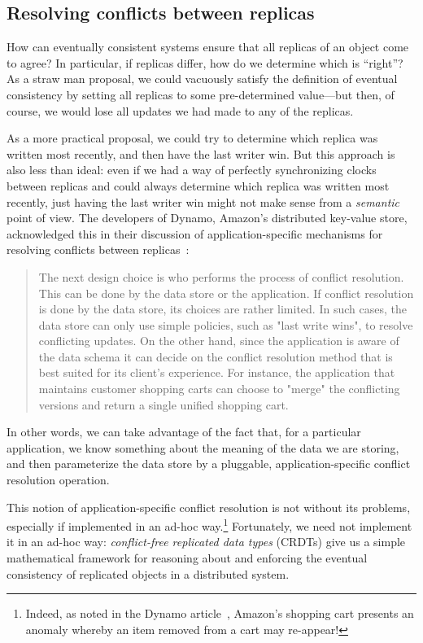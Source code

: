 \documentclass{article}
\begin{document}
\subsection{Resolving conflicts between replicas}

How can eventually consistent systems ensure that all replicas of an
object come to agree?  In particular, if replicas differ, how do we
determine which is ``right''?  As a straw man proposal, we could
vacuously satisfy the definition of eventual consistency by setting
all replicas to some pre-determined value---but then, of course, we
would lose all updates we had made to any of the replicas.

As a more practical proposal, we could try to determine which replica
was written most recently, and then have the last writer win.  But
this approach is also less than ideal: even if we had a way of
perfectly synchronizing clocks between replicas and could always
determine which replica was written most recently, just having the
last writer win might not make sense from a \emph{semantic} point of
view.  The developers of Dynamo, Amazon's distributed key-value store,
acknowledged this in their discussion of application-specific
mechanisms for resolving conflicts between replicas~\cite{dynamo}:
\begin{quote}
  The next design choice is who performs the process of conflict
  resolution. This can be done by the data store or the
  application. If conflict resolution is done by the data store, its
  choices are rather limited. In such cases, the data store can only
  use simple policies, such as "last write wins", to resolve
  conflicting updates. On the other hand, since the application is
  aware of the data schema it can decide on the conflict resolution
  method that is best suited for its client’s experience. For
  instance, the application that maintains customer shopping carts can
  choose to "merge" the conflicting versions and return a single
  unified shopping cart.
\end{quote}
In other words, we can take advantage of the fact that, for a
particular application, we know something about the meaning of the
data we are storing, and then parameterize the data store by a
pluggable, application-specific conflict resolution operation.

This notion of application-specific conflict resolution is not without
its problems, especially if implemented in an ad-hoc
way.\footnote{Indeed, as noted in the Dynamo article~\cite{dynamo},
  Amazon's shopping cart presents an anomaly whereby an item removed
  from a cart may re-appear!}  Fortunately, we need not implement it
in an ad-hoc way: \emph{conflict-free replicated data types} (CRDTs)
give us a simple mathematical framework for reasoning about and
enforcing the eventual consistency of replicated objects in a
distributed system.
\end{document}
